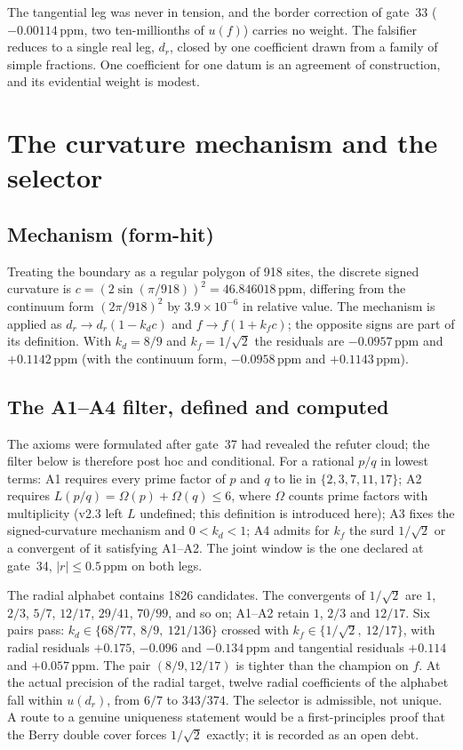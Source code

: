 \documentclass[11pt,a4paper]{article}
\newcommand{\ppm}{\ensuremath{\,\mathrm{ppm}}}
\begin{document}
The tangential leg was never in tension, and the border correction of gate~33 ($-0.00114\ppm$, two ten-millionths of $u(f)$) carries no weight. The falsifier reduces to a single real leg, $d_r$, closed by one coefficient drawn from a family of simple fractions. One coefficient for one datum is an agreement of construction, and its evidential weight is modest.

\section{The curvature mechanism and the selector}
\subsection{Mechanism (form-hit)}
Treating the boundary as a regular polygon of 918 sites, the discrete signed curvature is $c = (2\sin(\pi/918))^2 = 46.846018\ppm$, differing from the continuum form $(2\pi/918)^2$ by $3.9\times10^{-6}$ in relative value. The mechanism is applied as $d_r \to d_r(1-k_d c)$ and $f \to f(1+k_f c)$; the opposite signs are part of its definition. With $k_d = 8/9$ and $k_f = 1/\sqrt2$ \citep{berry1984} the residuals are $-0.0957\ppm$ and $+0.1142\ppm$ (with the continuum form, $-0.0958\ppm$ and $+0.1143\ppm$).

\subsection{The A1--A4 filter, defined and computed}
The axioms were formulated after gate~37 had revealed the refuter cloud; the filter below is therefore post hoc and conditional. For a rational $p/q$ in lowest terms: A1 requires every prime factor of $p$ and $q$ to lie in $\{2,3,7,11,17\}$; A2 requires $L(p/q) = \Omega(p)+\Omega(q) \le 6$, where $\Omega$ counts prime factors with multiplicity (v2.3 left $L$ undefined; this definition is introduced here); A3 fixes the signed-curvature mechanism and $0<k_d<1$; A4 admits for $k_f$ the surd $1/\sqrt2$ or a convergent of it satisfying A1--A2. The joint window is the one declared at gate~34, $|r|\le0.5\ppm$ on both legs.

The radial alphabet contains 1826 candidates. The convergents of $1/\sqrt2$ are $1$, $2/3$, $5/7$, $12/17$, $29/41$, $70/99$, and so on; A1--A2 retain $1$, $2/3$ and $12/17$. Six pairs pass: $k_d \in \{68/77,\ 8/9,\ 121/136\}$ crossed with $k_f \in \{1/\sqrt2,\ 12/17\}$, with radial residuals $+0.175$, $-0.096$ and $-0.134\ppm$ and tangential residuals $+0.114$ and $+0.057\ppm$. The pair $(8/9, 12/17)$ is tighter than the champion on $f$. At the actual precision of the radial target, twelve radial coefficients of the alphabet fall within $u(d_r)$, from $6/7$ to $343/374$. The selector is admissible, not unique. A route to a genuine uniqueness statement would be a first-principles proof that the Berry double cover forces $1/\sqrt2$ exactly; it is recorded as an open debt.
\end{document}
